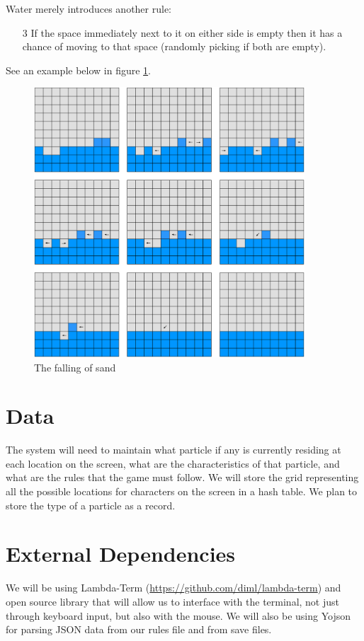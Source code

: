 Water merely introduces another rule:
\begin{enumerate}
  \item[3] If the space immediately next to it on either side is empty then it has a chance
    of moving to that space (randomly picking if both are empty).
\end{enumerate}
See an example below in figure \ref{fig:water}.

\begin{figure}[H]
  \caption{The falling of sand}
  \label{fig:water}
  \vspace{3em}
  \center\includegraphics[width=0.9\textwidth]{images/grid_water}
\end{figure}

\section{Data}
The system will need to maintain what particle if any is currently residing at each location on the screen, what are the characteristics of that particle, and what are the rules that the game must follow. We will store the grid representing all the possible locations for characters on the screen in a hash table. We plan to store the type of a particle as a record. 

\section{External Dependencies}
We will be using Lambda-Term (\url{https://github.com/diml/lambda-term}) and open source library that will allow us to interface with the terminal, not just through keyboard input, but also with the mouse. We will also be using Yojson for parsing JSON data from our rules file and from save files.

